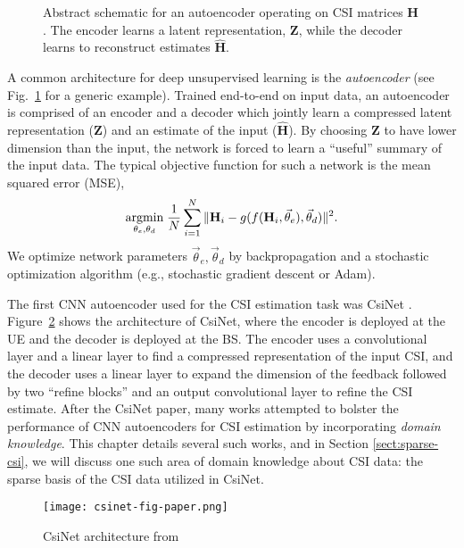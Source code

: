 \begin{figure}[!hbtp]
\centering
\def\svgwidth{0.8\columnwidth}

\caption{Abstract schematic for an autoencoder operating on CSI matrices $\mathbf H$. The encoder learns a latent representation, $\mathbf Z$, while the decoder learns to reconstruct estimates $\hat{\mathbf H}$.}
\label{fig:autoencoder_schematic}
\end{figure}

A common architecture for deep unsupervised learning is the \emph{autoencoder} (see Fig.~\ref{fig:autoencoder_schematic} for a generic example). Trained end-to-end on input data, an autoencoder is comprised of an encoder and a decoder which jointly learn a compressed latent representation ($\mathbf Z$) and an estimate of the input ($\hat{\mathbf H}$). By choosing $\mathbf Z$ to have lower dimension than the input, the network is forced to learn a ``useful'' summary of the input data. The typical objective function for such a network is the mean squared error (MSE),
\begin{align*}
\underset{\theta_e, \theta_d}{\text{argmin}}\; \frac 1N \sum_{i=1}^N\Arrowvert \mathbf H_i - g(f(\mathbf H_i, \vec\theta_e), \vec\theta_d) \Arrowvert^2.
\end{align*}
We optimize network parameters $\vec \theta_e, \vec \theta_d$ by backpropagation and a stochastic optimization algorithm (e.g., stochastic gradient descent or Adam).

The first CNN autoencoder used for the CSI estimation task was CsiNet \cite{ref:csinet}. Figure~\ref{fig:csinet} shows the architecture of CsiNet, where the encoder is deployed at the UE and the decoder is deployed at the BS. The encoder uses a convolutional layer and a linear layer to find a compressed representation of the input CSI, and the decoder uses a linear layer to expand the dimension of the feedback followed by two ``refine blocks'' and an output convolutional layer to refine the CSI estimate. After the CsiNet paper, many works attempted to bolster the performance of CNN autoencoders for CSI estimation by incorporating \emph{domain knowledge}. This chapter details several such works, and in Section \ref{sect:sparse-csi}, we will discuss one such area of domain knowledge about CSI data: the sparse basis of the CSI data utilized in CsiNet. 

\begin{figure}[htb]
	\centering
	\texttt{[image: csinet-fig-paper.png]}
	\caption{CsiNet architecture from \cite{ref:csinet}}
	\label{fig:csinet}
\end{figure}

